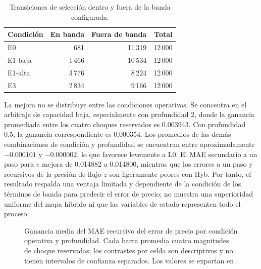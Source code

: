 \begin{table}[htbp]
\centering
\caption{Transiciones de selección dentro y fuera de la banda configurada.}
\label{tab:hybrid-regimes}
\small
\begin{tabular}{@{}lrrr@{}}
\toprule
Condición & En banda & Fuera de banda & Total \\
\midrule
E0 & 681 & 11\,319 & 12\,000 \\
E1-baja & 1\,466 & 10\,534 & 12\,000 \\
E1-alta & 3\,776 & 8\,224 & 12\,000 \\
E3 & 2\,834 & 9\,166 & 12\,000 \\
\bottomrule
\end{tabular}
\end{table}

La mejora no se distribuye entre las condiciones operativas. Se concentra en el arbitraje de capacidad baja, especialmente con profundidad 2, donde la ganancia promediada entre los cuatro choques reservados es 0.003943. Con profundidad 0.5, la ganancia correspondiente es 0.000354. Los promedios de las demás combinaciones de condición y profundidad se encuentran entre aproximadamente $-0.000101$ y $-0.000002$, lo que favorece levemente a L0. El MAE secundario a un paso para $e$ mejora de 0.014882 a 0.014800, mientras que los errores a un paso y recursivos de la presión de flujo $z$ son ligeramente peores con Hyb. Por tanto, el resultado respalda una ventaja limitada y dependiente de la condición de los términos de banda para predecir el error de precio; no muestra una superioridad uniforme del mapa híbrido ni que las variables de estado representen todo el proceso.

\begin{figure}[H]
\centering
{}
\caption{Ganancia media del MAE recursivo del error de precio por condición operativa y profundidad. Cada barra promedia cuatro magnitudes de choque reservadas; los contrastes por celda son descriptivos y no tienen intervalos de confianza separados. Los valores se exportan en .}
\label{fig:hybrid-cell-gains}
\end{figure}

